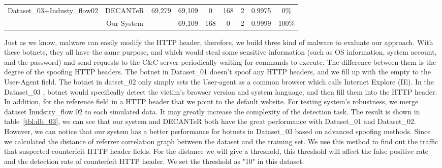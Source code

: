 \begin{table*}[!h]
\begin{tabular}{|c|c|c|c|c|c|c|c|c|}
\multirow{2}{*}{Dataset\_03+Industy\_flow02} & DECANTeR   \cite{bortolameotti2017decanter}              & \multirow{2}{*}{69,279}        & 69,109     & 0       & 168     & 2      & 0.9975                    & 0\%                                                                                               \\ \cline{2-2} \cline{4-9} 
                                             & Our System              &                                & 69,109     & 168     & 0       & 2      & 0.9999                    & 100\%                                                                                             \\ \hline\hline
\end{tabular}
\end{table*}



Just as we know, malware can easily modify the HTTP header, therefore, we build three kind of malware to evaluate our approach. With these botnets, they all have the same purpose, and which would steal some sensitive information (such as OS information, system account, and the password) and send requests to the C\&C server periodically waiting for commands to execute. The difference between them is the degree of the spoofing HTTP headers. The botnet in Dataset\_01 doesn't spoof any HTTP headers, and we fill up with the empty to the User-Agent field. The botnet in datset\_02 only simply sets the User-agent as a common browser which calls Internet Explore (IE). In the Dataset\_03 , botnet would specifically detect the victim's browser version and system language, and then fill them into the HTTP header. In addition, for the reference field in a HTTP header that we point to the default website. For testing system's robustness, we merge dataset Inudstry\_flow 02 to each simulated data. It may greatly increase the complexity of the detection task. The result is shown in table~\ref{tbl:db_03}, we can see that our system and DECANTeR \cite{bortolameotti2017decanter} both have the great performance with Dataset\_01 and Dataset\_02. However, we can notice that our system has a better performance for botnets in Dataset\_03 based on advanced spoofing methods. Since we calculated the distance of referrer correlation graph between the dataset and the training set. We use this method to find out the traffic that suspected counterfeit HTTP header fields. For the distance we will give a threshold, this threshold will affect the false positive rate and the detection rate of counterfeit HTTP header. We set the threshold as "10" in this dataset.

